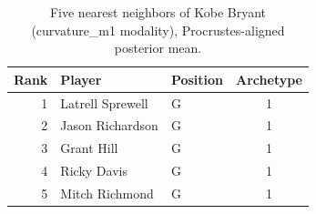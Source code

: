 \begin{table}[htbp]
  \centering\small
  \begin{tabular}{rllc}
    \toprule
    Rank & Player & Position & Archetype \\
    \midrule
    1 & Latrell Sprewell & G & 1 \\
    2 & Jason Richardson & G & 1 \\
    3 & Grant Hill & G & 1 \\
    4 & Ricky Davis & G & 1 \\
    5 & Mitch Richmond & G & 1 \\
    \bottomrule
  \end{tabular}
  \caption{Five nearest neighbors of Kobe Bryant (curvature_m1 modality), Procrustes-aligned posterior mean.}
  \label{tab:Kobe_Bryant_neighbors_curvature_m1}
\end{table}

